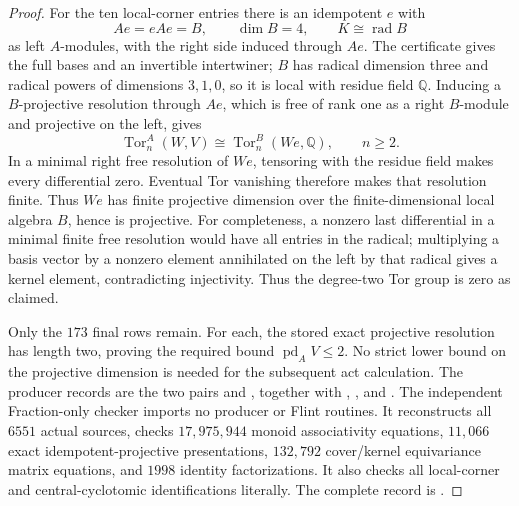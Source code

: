 \begin{proof}
For the ten local-corner entries there is an idempotent $e$ with
\[
 Ae=eAe=B,\qquad \dim B=4,
 \qquad K\cong\operatorname{rad}B
\]
as left $A$-modules, with the right side induced through $Ae$.
The certificate gives the full bases and an invertible intertwiner;
$B$ has radical dimension three and radical powers of dimensions
$3,1,0$, so it is local with residue field $\mathbb Q$.
Inducing a $B$-projective resolution through $Ae$, which is free of
rank one as a right $B$-module and projective on the left, gives
\[
 \operatorname{Tor}_n^A(W,V)
   \cong\operatorname{Tor}_n^B(We,\mathbb Q),\qquad n\geq2.
\]
In a minimal right free resolution of $We$, tensoring with the residue
field makes every differential zero.  Eventual Tor vanishing therefore
makes that resolution finite.  Thus $We$ has finite projective dimension
over the finite-dimensional local algebra $B$, hence is projective.
For completeness, a nonzero last differential in a minimal finite
free resolution would have all entries in the radical; multiplying
a basis vector by a nonzero element annihilated on the left by that
radical gives a kernel element, contradicting injectivity.
Thus the degree-two Tor group is zero as claimed.

Only the $173$ final rows remain.  For each, the stored exact
projective resolution has length two, proving the required bound
$\operatorname{pd}_A V\leq2$.  No strict lower bound on the projective
dimension is needed for the subsequent act calculation.
The producer records are the two pairs
 and
, together with
,
, and
.
The independent Fraction-only checker
 imports no producer
or Flint routines.  It reconstructs all $6551$ actual sources,
checks $17{,}975{,}944$ monoid associativity equations,
$11{,}066$ exact idempotent-projective presentations,
$132{,}792$ cover/kernel equivariance matrix equations, and
$1998$ identity factorizations.  It also checks all local-corner and
central-cyclotomic identifications literally.  The complete record is
.
\end{proof}

